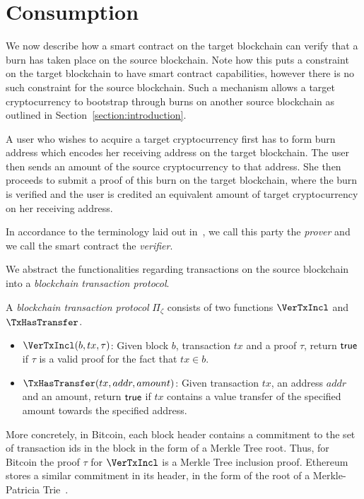 \section{Consumption}

We now describe how a smart contract on the target blockchain can verify that a burn has taken place on the source blockchain. Note how this puts a constraint on the target blockchain to have smart contract capabilities, however there is no such constraint for the source blockchain. Such a mechanism allows a target cryptocurrency to bootstrap through burns on another source blockchain as outlined in Section~\ref{section:introduction}.

A user who wishes to acquire a target cryptocurrency first has to form burn address which encodes her receiving address on the target blockchain. The user then sends an amount of the source cryptocurrency to that address. She then proceeds to submit a proof of this burn on the target blockchain, where the burn is verified and the user is credited an equivalent amount of target cryptocurrency on her receiving address.

In accordance to the terminology laid out in~\cite{pow-sidechains}, we call this party the \emph{prover} and we call the smart contract the \emph{verifier}.

We abstract the functionalities regarding transactions on the source blockchain into a \emph{blockchain transaction protocol}.

\begin{definition}\label{def:blockchain-tx}
  A \emph{blockchain transaction protocol} $\Pi_\zeta$ consists of two functions $\VerTxIncl$ and $\TxHasTransfer$.

  \begin{itemize}
    \item $\VerTxIncl(b, tx, \tau)$: Given block $b$, transaction $tx$ and a proof $\tau$, return $\mathsf{true}$ if $\tau$ is a valid proof for the fact that $tx \in b$.
    \item $\TxHasTransfer(tx, addr, amount)$: Given transaction $tx$, an address $addr$ and an amount, return $\mathsf{true}$ if $tx$ contains a value transfer of the specified amount towards the specified address.
  \end{itemize}
\end{definition}

More concretely, in Bitcoin, each block header contains a commitment to the set of transaction ids in the block in the form of a Merkle Tree root. Thus, for Bitcoin the proof $\tau$ for $\VerTxIncl$ is a Merkle Tree inclusion proof. Ethereum stores a similar commitment in its header, in the form of the root of a Merkle-Patricia Trie~\cite{wood2014ethereum}.

